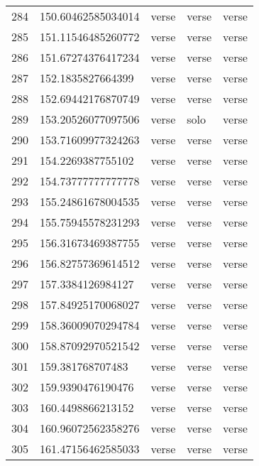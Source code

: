 \begin{table}[]
\begin{tabular}{lllll}
    284  & 150.60462585034014 & verse        & verse           & verse          \\
    285  & 151.11546485260772 & verse        & verse           & verse          \\
    286  & 151.67274376417234 & verse        & verse           & verse          \\
    287  & 152.1835827664399  & verse        & verse           & verse          \\
    288  & 152.69442176870749 & verse        & verse           & verse          \\
    289  & 153.20526077097506 & verse        & solo            & verse          \\
    290  & 153.71609977324263 & verse        & verse           & verse          \\
    291  & 154.2269387755102  & verse        & verse           & verse          \\
    292  & 154.73777777777778 & verse        & verse           & verse          \\
    293  & 155.24861678004535 & verse        & verse           & verse          \\
    294  & 155.75945578231293 & verse        & verse           & verse          \\
    295  & 156.31673469387755 & verse        & verse           & verse          \\
    296  & 156.82757369614512 & verse        & verse           & verse          \\
    297  & 157.3384126984127  & verse        & verse           & verse          \\
    298  & 157.84925170068027 & verse        & verse           & verse          \\
    299  & 158.36009070294784 & verse        & verse           & verse          \\
    300  & 158.87092970521542 & verse        & verse           & verse          \\
    301  & 159.381768707483   & verse        & verse           & verse          \\
    302  & 159.9390476190476  & verse        & verse           & verse          \\
    303  & 160.4498866213152  & verse        & verse           & verse          \\
    304  & 160.96072562358276 & verse        & verse           & verse          \\
    305  & 161.47156462585033 & verse        & verse           & verse          \\

\end{tabular}
\end{table}
